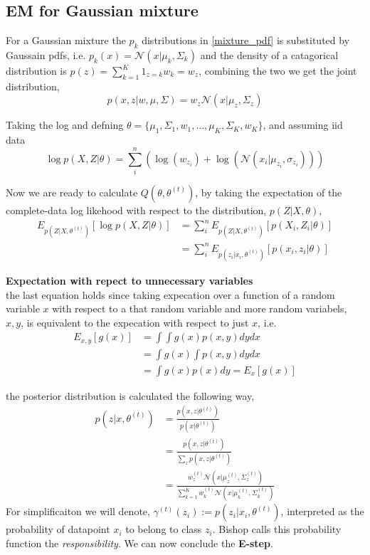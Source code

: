  \subsection{EM for Gaussian mixture}
 For a Gaussian mixture the $p_k$ distributions in \eqref{mixture_pdf} is substituted by Gaussain pdfs, 
 i.e. $p_k(x) = \mathcal{N}(x| \mu_k , \Sigma_k)$
 and the density of a catagorical distribution is $p(z) = \sum_{k=1}^K 1_{z=k} w_k = w_z$, combining the two
 we get the joint distribution, 
 $$p(x,z|w,\mu , \Sigma) = w_z \mathcal{N}(x| \mu_z , \Sigma_z)$$

 Taking the log and defning $\theta = \{\mu_1 , \Sigma_1,w_1, \dots, \mu_K , \Sigma_K, w_K\}$, and assuming iid data
 $$\log p(X,Z| \theta) = \sum_{i}^n \left(\log(w_{z_i})+\log(\mathcal{N}(x_i| \mu_{z_i} , \sigma_{z_i}))\right)$$

Now we are ready to calculate $Q(\theta, \theta^{(t)})$, by taking the expectation of the complete-data log likehood
with respect to the distribution, $p(Z|X, \theta)$, 
\begin{align*}
    E_{p(Z|X,  \theta^{(t)})}[\log p(X,Z| \theta)] &=\sum_{i}^n  E_{p(Z|X,  \theta^{(t)})}[p(X_i,Z_i| \theta) ]\\
    &=\sum_{i}^n  E_{p(z_i|x_i,  \theta^{(t)})}[p(x_i,z_i| \theta) ]
\end{align*}

\begin{tcolorbox}[
    sharp corners,
    boxrule=0mm,
    enhanced,
    borderline west={4pt}{0pt}{gray},
    colframe=drGray,
    colback=drGray,
    coltitle=black,
]
{\large \textbf{Expectation with repect to unnecessary variables}}\\
the last equation holds since taking expecation over a function of a random variable $x$ with respect to a that random
variable and more random variabels, $x,y$, is equivalent to the expecation with respect to just $x$, i.e. 
\begin{align*}
    E_{x,y}[g(x)] &= \int\int g(x) p(x,y) dy dx\\
     &= \int g(x) \int p(x,y) dy dx \\
    &= \int g(x) p(x) dy = E_x[g(x)]
\end{align*}
\end{tcolorbox}

the posterior distribution is calculated the following way,
\begin{align*}
    p(z|x, \theta^{(t)}) &= \frac{p(x,z|\theta^{(t)})}{p(x|\theta^{(t)})} \\
    &= \frac{p(x,z|\theta^{(t)})}{\sum_{z} p(x,z|\theta^{(t)})}\\
    &= \frac{w_z^{(t)} \mathcal{N}(x|\mu_z^{(t)}, \Sigma_z^{(t)})}{\sum_{k=1}^K w_k^{(t)} 
    \mathcal{N}(x|\mu_k^{(t)}, \Sigma_k^{(t)})}
\end{align*}
For simplificaiton we will denote, $\gamma^{(t)}(z_i) := p(z_i|x_i, \theta^{(t)})$, 
interpreted as the probability of datapoint $x_i$ to belong to class $z_i$. Bishop \cite*{bishop}
calls this probability function the \textit{responsibility}. We can now conclude the \textbf{E-step}.

